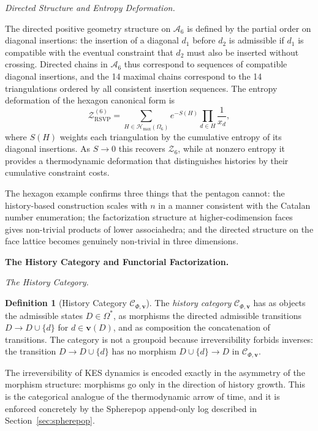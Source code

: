 \documentclass[12pt, oneside]{amsart}
\theoremstyle{plain}
\theoremstyle{definition}
\newtheorem{definition}[theorem]{Definition}
\theoremstyle{remark}
\newcommand{\Sf}{S}
\newcommand{\OmKS}{\Omega}
\newcommand{\Ccat}{\mathcal{C}_{\Phi,\mathbf{v}}}
\newcommand{\ZRSVP}{\mathcal{Z}_{\mathrm{RSVP}}}
\newcommand{\Hmax}{\mathcal{H}_{\max}}
\begin{document}
\medskip\noindent\textit{Directed Structure and Entropy Deformation.}

The directed positive geometry structure on $\mathcal{A}_6$ is defined by the partial order on diagonal insertions: the insertion of a diagonal $d_1$ before $d_2$ is admissible if $d_1$ is compatible with the eventual constraint that $d_2$ must also be inserted without crossing. Directed chains in $\mathcal{A}_6$ thus correspond to sequences of compatible diagonal insertions, and the 14 maximal chains correspond to the 14 triangulations ordered by all consistent insertion sequences. The entropy deformation of the hexagon canonical form is
\[
  \ZRSVP^{(6)} = \sum_{H \in \Hmax(\OmKS_6)} e^{-\Sf(H)} \prod_{d \in H} \frac{1}{x_d},
\]
where $\Sf(H)$ weights each triangulation by the cumulative entropy of its diagonal insertions. As $\Sf \to 0$ this recovers $\mathcal{Z}_6$, while at nonzero entropy it provides a thermodynamic deformation that distinguishes histories by their cumulative constraint costs.

The hexagon example confirms three things that the pentagon cannot: the history-based construction scales with $n$ in a manner consistent with the Catalan number enumeration; the factorization structure at higher-codimension faces gives non-trivial products of lower associahedra; and the directed structure on the face lattice becomes genuinely non-trivial in three dimensions.

\bigskip\noindent\textbf{The History Category and Functorial Factorization.}
\label{sec:categorical}

\medskip\noindent\textit{The History Category.}

\begin{definition}[History Category $\Ccat$]
The \emph{history category} $\Ccat$ has as objects the admissible states $D \in \OmKS^*$, as morphisms the directed admissible transitions $D \to D \cup \{d\}$ for $d \in \mathbf{v}(D)$, and as composition the concatenation of transitions. The category is not a groupoid because irreversibility forbids inverses: the transition $D \to D \cup \{d\}$ has no morphism $D \cup \{d\} \to D$ in $\Ccat$.
\end{definition}

The irreversibility of KES dynamics is encoded exactly in the asymmetry of the morphism structure: morphisms go only in the direction of history growth. This is the categorical analogue of the thermodynamic arrow of time, and it is enforced concretely by the Spherepop append-only log described in Section~\ref{sec:spherepop}.
\end{document}
